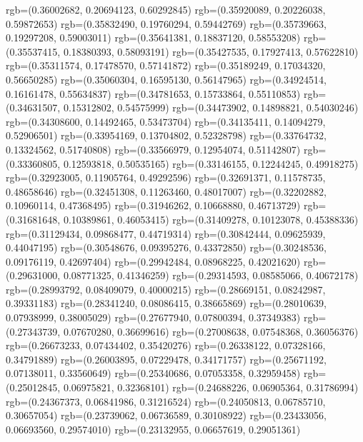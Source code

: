 {{        rgb=(0.36002682, 0.20694123, 0.60292845)
        rgb=(0.35920089, 0.20226038, 0.59872653)
        rgb=(0.35832490, 0.19760294, 0.59442769)
        rgb=(0.35739663, 0.19297208, 0.59003011)
        rgb=(0.35641381, 0.18837120, 0.58553208)
        rgb=(0.35537415, 0.18380393, 0.58093191)
        rgb=(0.35427535, 0.17927413, 0.57622810)
        rgb=(0.35311574, 0.17478570, 0.57141872)
        rgb=(0.35189249, 0.17034320, 0.56650285)
        rgb=(0.35060304, 0.16595130, 0.56147965)
        rgb=(0.34924514, 0.16161478, 0.55634837)
        rgb=(0.34781653, 0.15733864, 0.55110853)
        rgb=(0.34631507, 0.15312802, 0.54575999)
        rgb=(0.34473902, 0.14898821, 0.54030246)
        rgb=(0.34308600, 0.14492465, 0.53473704)
        rgb=(0.34135411, 0.14094279, 0.52906501)
        rgb=(0.33954169, 0.13704802, 0.52328798)
        rgb=(0.33764732, 0.13324562, 0.51740808)
        rgb=(0.33566979, 0.12954074, 0.51142807)
        rgb=(0.33360805, 0.12593818, 0.50535165)
        rgb=(0.33146155, 0.12244245, 0.49918275)
        rgb=(0.32923005, 0.11905764, 0.49292596)
        rgb=(0.32691371, 0.11578735, 0.48658646)
        rgb=(0.32451308, 0.11263460, 0.48017007)
        rgb=(0.32202882, 0.10960114, 0.47368495)
        rgb=(0.31946262, 0.10668880, 0.46713729)
        rgb=(0.31681648, 0.10389861, 0.46053415)
        rgb=(0.31409278, 0.10123078, 0.45388336)
        rgb=(0.31129434, 0.09868477, 0.44719314)
        rgb=(0.30842444, 0.09625939, 0.44047195)
        rgb=(0.30548676, 0.09395276, 0.43372850)
        rgb=(0.30248536, 0.09176119, 0.42697404)
        rgb=(0.29942484, 0.08968225, 0.42021620)
        rgb=(0.29631000, 0.08771325, 0.41346259)
        rgb=(0.29314593, 0.08585066, 0.40672178)
        rgb=(0.28993792, 0.08409079, 0.40000215)
        rgb=(0.28669151, 0.08242987, 0.39331183)
        rgb=(0.28341240, 0.08086415, 0.38665869)
        rgb=(0.28010639, 0.07938999, 0.38005029)
        rgb=(0.27677940, 0.07800394, 0.37349383)
        rgb=(0.27343739, 0.07670280, 0.36699616)
        rgb=(0.27008638, 0.07548368, 0.36056376)
        rgb=(0.26673233, 0.07434402, 0.35420276)
        rgb=(0.26338122, 0.07328166, 0.34791889)
        rgb=(0.26003895, 0.07229478, 0.34171757)
        rgb=(0.25671192, 0.07138011, 0.33560649)
        rgb=(0.25340686, 0.07053358, 0.32959458)
        rgb=(0.25012845, 0.06975821, 0.32368101)
        rgb=(0.24688226, 0.06905364, 0.31786994)
        rgb=(0.24367373, 0.06841986, 0.31216524)
        rgb=(0.24050813, 0.06785710, 0.30657054)
        rgb=(0.23739062, 0.06736589, 0.30108922)
        rgb=(0.23433056, 0.06693560, 0.29574010)
        rgb=(0.23132955, 0.06657619, 0.29051361)
}}
